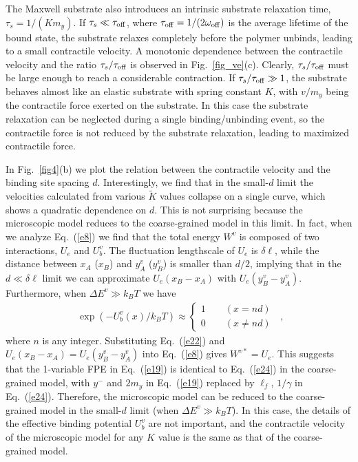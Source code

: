 \documentclass[twocolumn,prl,english]{revtex4-1}
\begin{document}
The Maxwell substrate also introduces an intrinsic substrate relaxation time, $\tau_{s}=1/(Km_y)$. If $\tau_s\ll\tau_{\rm off}$, where $\tau_{\rm off}=1/(2\omega_{\rm off})$ is the average lifetime of the bound state, the substrate relaxes completely before the polymer unbinds, leading to a small contractile velocity. A monotonic dependence between the contractile velocity and the ratio $\tau_s/\tau_{\rm off}$ is observed in Fig.~\ref{fig_ve}(c). Clearly,  $\tau_s/\tau_{\rm off}$ must be large enough to reach a considerable contraction.  If $\tau_s/\tau_{\rm off}\gg 1$, the substrate behaves almost like an elastic substrate with spring constant $K$, with $ v/m_y$ being the contractile force exerted on the substrate. In this case the substrate relaxation can be neglected during a single binding/unbinding event, so the contractile force is not reduced by the substrate relaxation, leading to maximized contractile force. 

In Fig.~\ref{fig4}(b) we plot the relation between the contractile velocity and the binding site spacing $d$. Interestingly, we find that in the small-$d$ limit the velocities calculated from various $\tilde K$ values collapse on a single curve, which shows a quadratic dependence on $d$. This is not surprising because the microscopic model reduces to the coarse-grained model in this limit. In fact, when we analyze Eq.~(\ref{e8}) we find that the total energy $W^v$ is composed of two interactions, $U_e$ and $U_b^v$. The fluctuation lengthscale of $U_e$ is $\delta \ell$, while the distance between $x_A$ ($x_B$) and $y_A^v$ ($y_B^v$) is smaller than $d/2$, implying that  in the $d\ll \delta \ell$ limit we can approximate $U_e(x_B-x_A)$ with $U_e(y_B^v-y_A^v)$.  Furthermore, when $\Delta E^v\gg k_B T$ we have
\begin{equation}
\begin{aligned}
\exp(-U_b^v(x)/k_BT)\approx \left\{ 
\begin{aligned}
1 \qquad(x = nd)\\
0 \qquad(x \neq nd)
\end{aligned}
\right.
\end{aligned} \, ,
\label{e22}
\end{equation}
where $n$ is any integer. Substituting Eq.~(\ref{e22}) and $U_e(x_B-x_A)=U_e(y_B^v-y_A^v)$ into Eq.~(\ref{e8}) gives $W^{v*}=U_e$. This suggests that the 1-variable FPE  in Eq.~(\ref{e19}) is identical to Eq.~(\ref{e24}) in the coarse-grained model, with $y^-$ and $2m_y$ in Eq.~(\ref{e19}) replaced by $\ell_f$, $1/\gamma$ in Eq.~(\ref{e24}). Therefore, the microscopic model can be reduced to the coarse-grained model in the small-$d$ limit (when $\Delta E^v\gg k_B T$). In this case, the details of the effective binding potential $U_b^v$ are not important, and the contractile velocity of the microscopic model for any $K$ value is the same as that of the coarse-grained model. 
\end{document}
